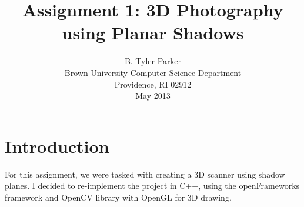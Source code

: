 \documentclass[10pt]{article}
\begin{document}
\title{Assignment 1: 3D Photography using Planar Shadows}
\author{B. Tyler Parker\\
\small Brown University Computer Science Department\\
\small Providence, RI 02912\\
\small May 2013\\[-0.25in]} \date{} %
\maketitle


\section{Introduction}
For this assignment, we were tasked with creating a 3D scanner using shadow planes. I decided to re-implement the project in C++, using the openFrameworks framework and OpenCV library with OpenGL for 3D drawing.
\end{document}
